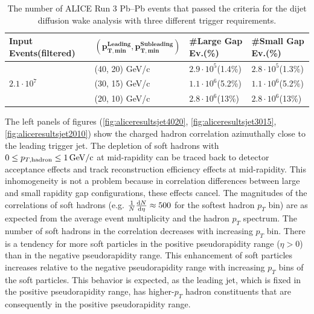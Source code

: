 \documentclass[
  a4paper,
  12pt,
  oneside,
  parskip=half,
  listof=totoc,
  bibliography=totoc,
  DIV=12,
  numbers=noenddot,
  BA.tex
  ]{subfiles}
\begin{document}
\begin{table}[H]
	\begin{footnotesize}
		\begin{tabular}{llll}
			\hline
			\textbf{Input Events(filtered)} & $\mathbf{(p_{T,\textbf{min}}^\textbf{Leading}, p_{T,\textbf{min}}^\textbf{Subleading})}$ & \textbf{\#Large Gap Ev.(\%)} & \textbf{\#Small Gap Ev.(\%)} \\
			\hline
			\multirow{3}{*}{$2.1 \cdot 10^7$}   & (40, 20) GeV/c   & $2.9\cdot 10^5$(1.4\%)                       & $2.8\cdot 10^5$(1.3\%)                       \\
			& (30, 15) GeV/c   &          $1.1\cdot 10^6$(5.2\%)                   &               $1.1\cdot 10^6$(5.2\%)               \\
			& (20, 10) GeV/c   &                $2.8\cdot 10^6$(13\%)              &               $2.8\cdot 10^6$(13\%)             \\
			\hline
		\end{tabular}
	\end{footnotesize}
	\caption{The number of ALICE Run 3 Pb--Pb events that passed the criteria for the dijet diffusion wake analysis with three different trigger requirements.}
	\label{tab:ALICEJetAcceptanceRates}
\end{table}

The left panels of figures (\ref{fig:aliceresultsjet4020}, \ref{fig:aliceresultsjet3015}, \ref{fig:aliceresultsjet2010}) show the charged hadron correlation azimuthally close to the leading trigger jet. The depletion of soft hadrons with $0 \leq p_{T,\text{hadron}} \leq 1 \bunit{GeV/c}$ at mid-rapidity can be traced back to detector acceptance effects and track reconstruction efficiency effects at mid-rapidity. This inhomogeneity is not a problem because in correlation differences between large and small rapidity gap configurations, these effects cancel. The magnitudes of the correlations of soft hadrons (e.g. $\frac{1}{N} \frac{\mathop{}\!\mathrm{d} N}{\mathop{}\!\mathrm{d} \eta} \approx 500$ for the softest hadron $p_T$ bin) are as expected from the average event multiplicity and the hadron $p_T$ spectrum. The number of soft hadrons in the correlation decreases with increasing $p_T$ bin. There is a tendency for more soft particles in the positive pseudorapidity range ($\eta > 0$) than in the negative pseudorapidity range. This enhancement of soft particles increases relative to the negative pseudorapidity range with increasing $p_T$ bins of the soft particles. This behavior is expected, as the leading jet, which is fixed in the positive pseudorapidity range, has higher-$p_T$ hadron constituents that are consequently in the positive pseudorapidity range.
\end{document}
